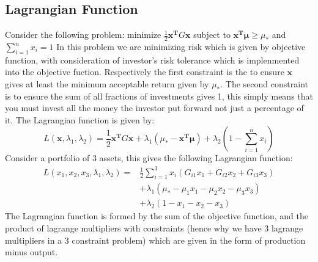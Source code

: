 \documentclass[11pt]{article}
\begin{document}
\subsection{Lagrangian Function}
Consider the following problem:
\newline minimize 
$\frac{1}{2} \mathbf{x^T}G\mathbf{x}$
\newline subject to
$\mathbf{x^T}  \boldsymbol\mu \geq \mu_{*}$ and $\sum_{i=1}^{n}  x_{i}=1$ 
\newline In this problem we are minimizing risk which is given by objective function, with consideration of investor's risk tolerance which is implenmented into the objective fuction. Respectively the first constraint is the to ensure $\mathbf{x}$ gives at least the minimum acceptable return given by $\mu_{*}$. The second constraint is to ensure the sum of all fractions of investments gives 1, this simply means that you must invest all the money the investor put forward not just a percentage of it.
\newline The Lagrangian function is given by:
\begin{equation*}
L\left (\mathbf{x},\lambda_{1},\lambda_{2} \right) = \frac{1}{2}  \mathbf{x^T}G\mathbf{x} + \lambda_{1} \left ( \mu_{*} - \mathbf{x^T}  \boldsymbol\mu \right ) + \lambda_{2} \left (1 - \sum_{i=1}^{n}  x_{i} \right) 
\end{equation*}
Consider a portfolio of 3 assets, this gives the following Lagrangian function:
\begin{equation*}
\begin{aligned}
L\left (x_{1},x_{2},x_3,\lambda_{1},\lambda_{2} \right)=&\frac{1}{2}\sum_{i=1}^{3} x_{i}\left(G_{i1}x_{1}+G_{i2}x_{2}+G_{i3}x_3\right) \\
&+ \lambda_{1} \left ( \mu_{*}-\mu_{1}x_{1}-\mu_{2}x_{2}-\mu_3x_3\right) \\
&+\lambda_{2} \left (1-x_{1}-x_{2}-x_3\right) 
\end{aligned}
\end{equation*}
The Lagrangian function is formed by the sum of the objective function, and the product of lagrange multipliers with constraints (hence why we have 3 lagrange multipliers in a 3 constraint problem) which are given in the form of production minus output.
\end{document}
